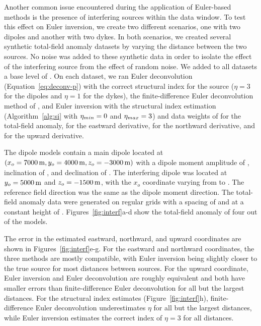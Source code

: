 Another common issue encountered during the application of Euler-based methods
is the presence of interfering sources within the data window.
To test this effect on Euler inversion, we create two different scenarios, one
with two dipoles and another with two dykes.
In both scenarios, we created several synthetic total-field anomaly datasets
by varying the distance between the two sources.
No noise was added to these synthetic data in order to isolate the effect of
the interfering source from the effect of random noise.
We added to all datasets a base level of \SynInterfTrueBase{}.
On each dataset, we ran Euler deconvolution (Equation~\ref{eq:deconv-p}) with
the correct structural index for the source ($\eta=3$ for the dipoles and
$\eta=1$ for the dykes), the finite-difference Euler deconvolution method of
\citet{Gerovska2005}, and Euler inversion with the structural index estimation
(Algorithm~\ref{alg:si} with $\eta_{min}=0$ and
$\eta_{max}=3$) and data weights of \DefaultWeightsF{} for the
total-field anomaly, \DefaultWeightsE{} for the eastward derivative,
\DefaultWeightsN{} for the northward derivative, and \DefaultWeightsU{} for the
upward derivative.

The dipole models contain a main dipole located at $(x_o=\SynInterfTrueEast,
y_o=\SynInterfTrueNorth, z_o=\SynInterfTrueUp)$ with a dipole moment amplitude
of \SynInterfInt{}, inclination of \SynInterfInc, and declination of
\SynInterfDec.
The interfering dipole was located at $y_o=\SynInterfInterfNorth$ and
$z_o=\SynInterfInterfUp$, with the $x_o$ coordinate varying from
\SynInterfInterfEastMin{} to \SynInterfInterfEastMax{}.
The reference field direction was the same as the dipole moment direction.
The total-field anomaly data were generated on regular grids with a spacing of
\SynInterfSpacing{} and at a constant height of \SynInterfHeight.
Figures~\ref{fig:interf}a-d show the total-field anomaly of four out of the
\SynInterfNModels{} models.

The error in the estimated eastward, northward, and upward coordinates are
shown in Figures~\ref{fig:interf}e-g.
For the eastward and northward coordinates, the three methods are mostly
compatible, with Euler inversion being slightly closer to the true source for
most distances between sources.
For the upward coordinate, Euler inversion and Euler deconvolution are
roughly equivalent and both have smaller errors than finite-difference Euler
deconvolution for all but the largest distances.
For the structural index estimates (Figure~\ref{fig:interf}h),
finite-difference Euler deconvolution underestimates $\eta$ for all but the
largest distances, while Euler inversion estimates the correct index of
$\eta=3$ for all distances.

